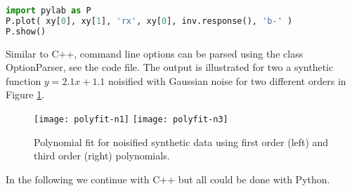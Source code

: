 \begin{lstlisting}[language=python]
import pylab as P
P.plot( xy[0], xy[1], 'rx', xy[0], inv.response(), 'b-' )
P.show()
\end{lstlisting}

Similar to C++, command line options can be parsed using the class OptionParser, see the code file.
The output is illustrated for two a synthetic function $y=2.1x+1.1$ noisified with Gaussian noise for two different orders in Figure \ref{fig:polyfit}.

\begin{figure}[hbt]%
\texttt{[image: polyfit-n1]}\hfill
\texttt{[image: polyfit-n3]}%
\caption{Polynomial fit for noisified synthetic data using first order (left) and third order (right) polynomials.}%
\label{fig:polyfit}%
\end{figure}

In the following we continue with C++ but all could be done with Python.